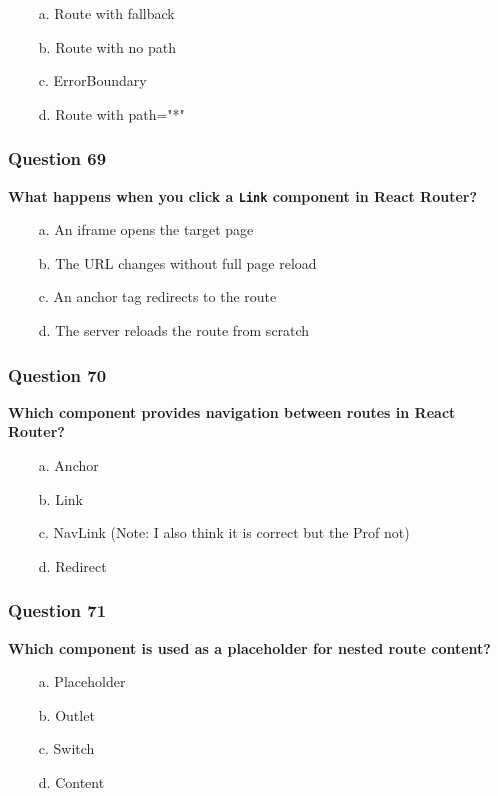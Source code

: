 \documentclass{article}
\newcommand{\cmark}{\textcolor{green}{\ding{51}}} %
\newcommand{\xmark}{\textcolor{red}{\ding{55}}}   %
\begin{document}
\begin{itemize}
  \item[\xmark\ a.] Route with fallback
  \item[\xmark\ b.] Route with no path
  \item[\xmark\ c.] ErrorBoundary
  \item[\cmark\ d.] Route with path="*"
\end{itemize}

\subsubsection*{Question 69}
\textbf{What happens when you click a \texttt{Link} component in React Router?}

\begin{itemize}
  \item[\xmark\ a.] An iframe opens the target page
  \item[\cmark\ b.] The URL changes without full page reload
  \item[\xmark\ c.] An anchor tag redirects to the route
  \item[\xmark\ d.] The server reloads the route from scratch
\end{itemize}

\subsubsection*{Question 70}
\textbf{Which component provides navigation between routes in React Router?}

\begin{itemize}
  \item[\xmark\ a.] Anchor
  \item[\cmark\ b.] Link
  \item[\xmark\ c.] NavLink (Note: I also think it is correct but the Prof not)
  \item[\xmark\ d.] Redirect
\end{itemize}

\subsubsection*{Question 71}
\textbf{Which component is used as a placeholder for nested route content?}

\begin{itemize}
  \item[\xmark\ a.] Placeholder
  \item[\cmark\ b.] Outlet
  \item[\xmark\ c.] Switch
  \item[\xmark\ d.] Content
\end{itemize}
\end{document}
